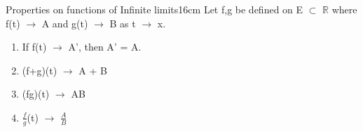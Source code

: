     \vspace{0.5cm}



    \begin{wtheorem}{Properties on functions of Infinite limits}{16cm}
        Let f,g be defined on E $\subset$ $\mathbb{R}$ where
        f(t) $\rightarrow$ A and g(t) $\rightarrow$ B as t $\rightarrow$ x.
    \end{wtheorem}

    \begin{enumerate}[label=(\alph*), leftmargin=2cm, itemsep=0.1cm]
        \item If f(t) $\rightarrow$ A', then A' = A.
        
        \item (f+g)(t) $\rightarrow$ A + B
        
        \item (fg)(t) $\rightarrow$ AB
        
        \item $\frac{f}{g}$(t) $\rightarrow$ $\frac{A}{B}$
    \end{enumerate}




    